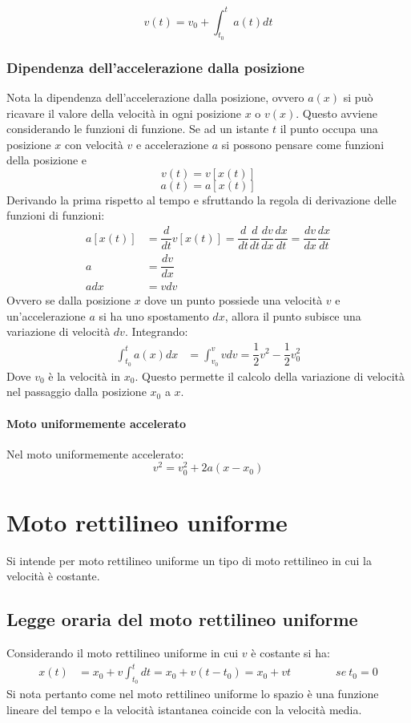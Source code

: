 \documentclass[class=book, crop=false, oneside, 12pt]{standalone}
\begin{document}
		\begin{equation}
			v(t) = v_0 + \int_{t_0}^t a(t)dt
		\end{equation}

		\subsubsection{Dipendenza dell'accelerazione dalla posizione}
		Nota la dipendenza dell'accelerazione dalla posizione, ovvero $a(x)$ si pu\`o ricavare il valore della velocit\`a in ogni posizione $x$ o $v(x)$.
		Questo avviene considerando le funzioni di funzione.
		Se ad un istante $t$ il punto occupa una posizione $x$ con velocit\`a $v$ e accelerazione $a$ si possono pensare come funzioni della posizione e
		$$v(t) = v[x(t)]$$
		$$a(t) = a[x(t)]$$
		Derivando la prima rispetto al tempo e sfruttando la regola di derivazione delle funzioni di funzioni:
		\begin{align*}
			a[x(t)] &= \dfrac{d}{dt}v[x(t)] = \dfrac{d}{dt}\dfrac{d}{dt}\dfrac{dv}{dx}\dfrac{dx}{dt} = \dfrac{dv}{dx}\dfrac{dx}{dt}\\
			a  	    &= \dfrac{dv}{dx}\\
			adx     &= vdv
		\end{align*}
		Ovvero se dalla posizione $x$ dove un punto possiede una velocit\`a $v$ e un'accelerazione $a$ si ha uno spostamento $dx$, allora il punto subisce una variazione di velocit\`a $dv$.
		Integrando:
		\begin{align*}
			\int_{t_0}^t a(x)dx &= \int_{v_0}^{v} vdv = \dfrac{1}{2}v^2 -\dfrac{1}{2}v_0^2
		\end{align*}
		Dove $v_0$ \`e la velocit\`a in $x_0$.
		Questo permette il calcolo della variazione di velocit\`a nel passaggio dalla posizione $x_0$ a $x$.
			\paragraph{Moto uniformemente accelerato}
			Nel moto uniformemente accelerato:
			$$v^2 = v_0^2 + 2a(x-x_0)$$
\section{Moto rettilineo uniforme}
Si intende per moto rettilineo uniforme un tipo di moto rettilineo in cui la velocit\`a \`e costante.
  \subsection{Legge oraria del moto rettilineo uniforme}
	Considerando il moto rettilineo uniforme in cui $v$ \`e costante si ha:
	\begin{align*}
		x(t) &= x_0 + v\int_{t_0}^t dt=x_0 + v(t-t_0)=x_0 + vt\qquad\qquad se\ t_0 = 0
	\end{align*}
	Si nota pertanto come nel moto rettilineo uniforme lo spazio \`e una funzione lineare del tempo e la velocit\`a istantanea coincide con la velocit\`a media.
\end{document}
